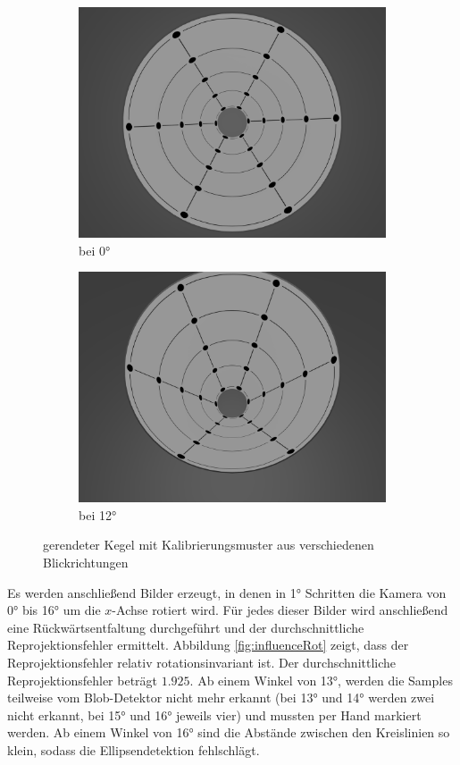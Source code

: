 \begin{figure}[!htb]
	\centering
	\begin{subfigure}{.5\textwidth}
		\centering
		\includegraphics[width=.9\textwidth]{images/blender0.png}
		\caption{bei 0°}
	\end{subfigure}%
	\begin{subfigure}{.5\textwidth}
		\centering
		\includegraphics[width=.9\textwidth]{images/blender12.png}
		\caption{bei 12°}
	\end{subfigure}
	\caption{gerendeter Kegel mit Kalibrierungsmuster aus verschiedenen Blickrichtungen}
	\label{fig:blender}
\end{figure}


Es werden anschließend Bilder erzeugt, in denen in 1° Schritten die Kamera von 0° bis 16° um die $x$-Achse rotiert wird. Für jedes dieser Bilder wird anschließend eine Rückwärtsentfaltung durchgeführt und der durchschnittliche Reprojektionsfehler ermittelt. Abbildung \ref{fig:influenceRot} zeigt, dass der Reprojektionsfehler relativ rotationsinvariant ist. Der durchschnittliche Reprojektionsfehler beträgt $1.925$. Ab einem Winkel von  13°, werden die Samples teilweise vom Blob-Detektor nicht mehr erkannt (bei 13° und 14° werden zwei nicht erkannt, bei 15° und 16° jeweils vier) und mussten per Hand markiert werden. Ab einem Winkel von 16° sind die Abstände zwischen den Kreislinien so klein, sodass die Ellipsendetektion fehlschlägt.


